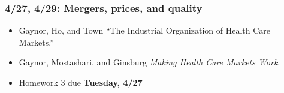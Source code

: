 \documentclass[11pt,]{article}
\providecommand{\tightlist}{%
  \setlength{\itemsep}{0pt}\setlength{\parskip}{0pt}}
\begin{document}
\hypertarget{mergers-prices-and-quality}{%
\subsubsection{4/27, 4/29: Mergers, prices, and
quality}\label{mergers-prices-and-quality}}

\begin{itemize}
\tightlist
\item
  Gaynor, Ho, and Town ``The Industrial Organization of Health Care
  Markets.''
\item
  Gaynor, Mostashari, and Ginsburg \emph{Making Health Care Markets
  Work}.
\item
  Homework 3 due \textbf{Tuesday, 4/27}
\end{itemize}
\end{document}
